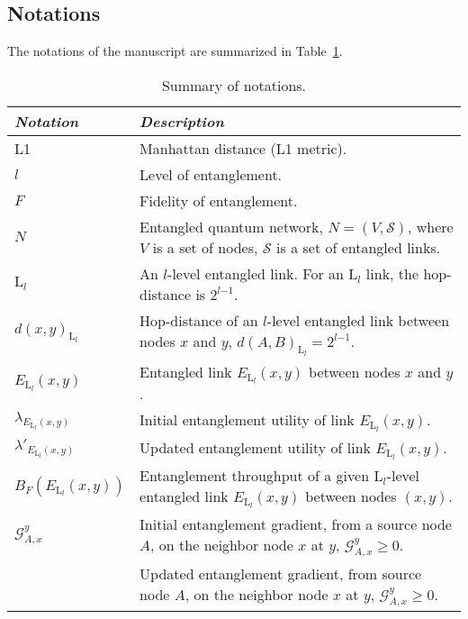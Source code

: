 \documentclass[11pt]{article}%
\newcommand{\tref}[1]{Table~\ref{#1}}
\begin{document}
\newpage
\subsection{Notations}
The notations of the manuscript are summarized in \tref{tab1}.

\begin{longtable}{|p{1.6in}|p{2.8in}|} 
\caption{Summary of notations.}
\label{tab1}
\endfirsthead
\endhead
\hline
\textit{Notation} & \textit{Description} \\ \hline 
L1\textit{} & Manhattan distance (L1 metric). \\ \hline 
$l$  & Level of entanglement.  \\ \hline 
$F$ & Fidelity of entanglement.  \\ \hline 
$N$ & Entangled quantum network, $N\mathrm{=}\left(V,\mathcal{S}\right)$, where $V$ is a set of nodes, $\mathcal{S}$ is a set of entangled links. \\ \hline 
${\mathrm{L}}_l$\textit{} & An $l$-level entangled link. For an ${\mathrm{L}}_l$ link, the hop-distance is ${\mathrm{2}}^{l\mathrm{-}\mathrm{1}}$. \\ \hline 
$d{\left(x,y\right)}_{{\mathrm{L}}_l}$\textit{} & Hop-distance of an $l$-level entangled link between nodes $x$ and $y$, $d{\left(A,B\right)}_{{\mathrm{L}}_l}\mathrm{=}{\mathrm{2}}^{l\mathrm{-}\mathrm{1}}$.  \\ \hline 
$E_{{\mathrm{L}}_l}\left(x,y\right)$ & Entangled link\textit{ }$E_{{\mathrm{L}}_l}\left(x,y\right)$ between nodes $x$ and $y$. \\ \hline 
${\lambda }_{E_{{\mathrm{L}}_l}\left(x,y\right)}$ & Initial entanglement utility of link $E_{{\mathrm{L}}_l}\left(x,y\right)$. \\ \hline 
${\lambda }'_{E_{{\mathrm{L}}_l}\left(x,y\right)}$ & Updated entanglement utility of link $E_{{\mathrm{L}}_l}\left(x,y\right)$. \\ \hline 
$B_F\left(E_{{\mathrm{L}}_l}\left(x,y\right)\right)$ & Entanglement throughput of a given ${\mathrm{L}}_l$-level entangled link $E_{{\mathrm{L}}_l}\left(x,y\right)$ between nodes $\left(x,y\right)$. \\ \hline 
${\mathcal{G}}^y_{A,x}$\textit{} & Initial entanglement gradient, from a source node $A$, on the neighbor node $x$ at $y$, ${\mathcal{G}}^y_{A,x}\mathrm{\ge }\mathrm{0}$. \\ \hline 
\textit{} & Updated entanglement gradient, from source node $A$, on the neighbor node $x$ at $y$, ${\mathcal{G}}^y_{A,x}\mathrm{\ge }\mathrm{0}$. \\ \hline 

\end{longtable}
\end{document}
